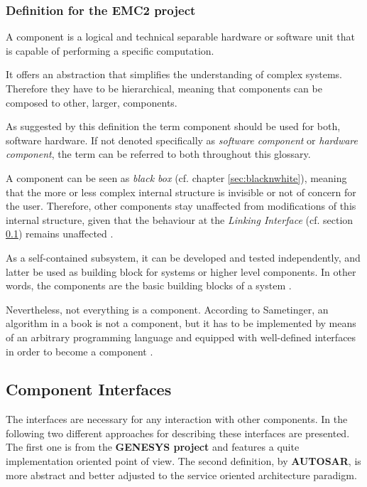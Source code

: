\subsubsection{Definition for the EMC2 project}


\begin{myquote}
A component is a logical and technical separable hardware or software unit that is capable of performing a specific computation.

It offers an abstraction that simplifies the understanding of complex systems. Therefore they have to be hierarchical, meaning that components can be composed to other, larger, components.
\end{myquote}

As suggested by this definition the term component should be used for both, software hardware. If not denoted specifically as \emph{software component} or \emph{hardware component}, the term can be referred to both throughout this glossary.

A component can be seen as \emph{black box} (cf. chapter \ref{sec:blacknwhite}), meaning that the more or less complex internal structure is invisible or not of concern for the user. Therefore, other components stay unaffected from modifications of this internal structure, given that the behaviour at the \emph{Linking Interface} (cf. section \ref{sec:component_interfaces}) remains unaffected \cite[p.38-39]{genesys} \cite{autosar_intro} \cite{sametinger}.

As a self-contained subsystem, it can be developed and tested independently, and latter be used as building block for systems or higher level components. In other words, the components are the basic building blocks of a system \cite{ning}. 

Nevertheless, not everything is a component. According to Sametinger, an algorithm in a book is not a component, but it has to be implemented by means of an arbitrary programming language and equipped with well-defined interfaces in order to become a component \cite[p.2-3]{sametinger}.


\subsection{Component Interfaces}
\label{sec:component_interfaces}


The interfaces are necessary for any interaction with other components. In the following two different approaches for describing these interfaces are presented. The first one is from the \textbf{GENESYS project} and features a quite implementation oriented point of view. The second definition, by \textbf{AUTOSAR}, is more abstract and better adjusted to the service oriented architecture paradigm.



